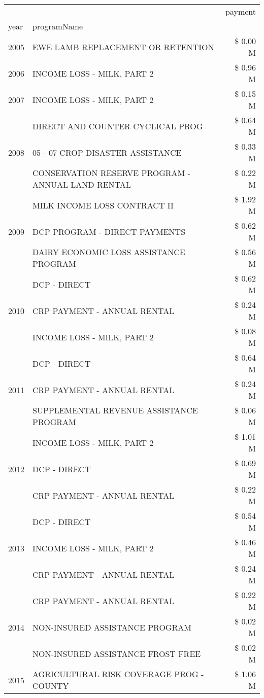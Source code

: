 \begin{tabular}{llr}
\toprule
 &  & payment \\
year & programName &  \\
\midrule
2005 & EWE LAMB REPLACEMENT OR RETENTION & \$ 0.00 M \\
\cline{1-3}
2006 & INCOME LOSS - MILK, PART 2 & \$ 0.96 M \\
\cline{1-3}
2007 & INCOME LOSS - MILK, PART 2 & \$ 0.15 M \\
\cline{1-3}
\multirow[t]{3}{*}{2008} & DIRECT AND COUNTER CYCLICAL PROG & \$ 0.64 M \\
 & 05 - 07 CROP DISASTER ASSISTANCE & \$ 0.33 M \\
 & CONSERVATION RESERVE PROGRAM - ANNUAL LAND RENTAL & \$ 0.22 M \\
\cline{1-3}
\multirow[t]{3}{*}{2009} & MILK INCOME LOSS CONTRACT II & \$ 1.92 M \\
 & DCP PROGRAM - DIRECT PAYMENTS & \$ 0.62 M \\
 & DAIRY ECONOMIC LOSS ASSISTANCE PROGRAM & \$ 0.56 M \\
\cline{1-3}
\multirow[t]{3}{*}{2010} & DCP - DIRECT & \$ 0.62 M \\
 & CRP PAYMENT - ANNUAL RENTAL & \$ 0.24 M \\
 & INCOME LOSS - MILK, PART 2 & \$ 0.08 M \\
\cline{1-3}
\multirow[t]{3}{*}{2011} & DCP - DIRECT & \$ 0.64 M \\
 & CRP PAYMENT - ANNUAL RENTAL & \$ 0.24 M \\
 & SUPPLEMENTAL REVENUE ASSISTANCE PROGRAM & \$ 0.06 M \\
\cline{1-3}
\multirow[t]{3}{*}{2012} & INCOME LOSS - MILK, PART 2 & \$ 1.01 M \\
 & DCP - DIRECT & \$ 0.69 M \\
 & CRP PAYMENT - ANNUAL RENTAL & \$ 0.22 M \\
\cline{1-3}
\multirow[t]{3}{*}{2013} & DCP - DIRECT & \$ 0.54 M \\
 & INCOME LOSS - MILK, PART 2 & \$ 0.46 M \\
 & CRP PAYMENT - ANNUAL RENTAL & \$ 0.24 M \\
\cline{1-3}
\multirow[t]{3}{*}{2014} & CRP PAYMENT - ANNUAL RENTAL & \$ 0.22 M \\
 & NON-INSURED ASSISTANCE PROGRAM & \$ 0.02 M \\
 & NON-INSURED ASSISTANCE FROST FREE & \$ 0.02 M \\
\cline{1-3}
\multirow[t]{3}{*}{2015} & AGRICULTURAL RISK COVERAGE PROG - COUNTY & \$ 1.06 M \\

\end{tabular}
